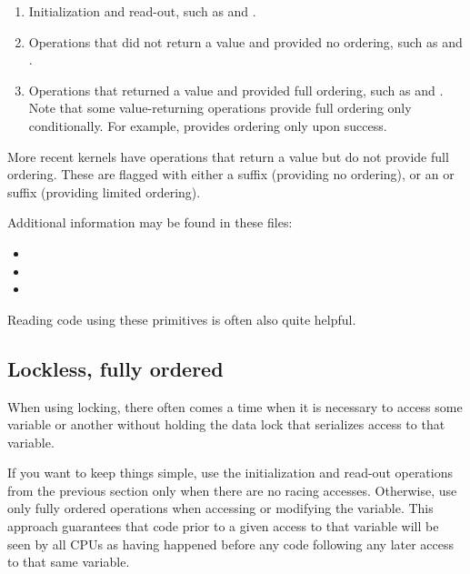 \begin{enumerate}
  \item Initialization and read-out, such as  and .

  \item Operations that did not return a value and provided no ordering,
	such as  and .

  \item Operations that returned a value and provided full ordering, such as
	 and .
	Note that some value-returning operations provide full ordering
	only conditionally.
	For example,  provides ordering only upon success.
\end{enumerate}

More recent kernels have operations that return a value but do not
provide full ordering.  These are flagged with either a 
suffix (providing no ordering), or an  or  suffix
(providing limited ordering).

Additional information may be found in these files:

\begin{itemize}
  \item {}
  \item {}
  \item {}
\end{itemize}

Reading code using these primitives is often also quite helpful.


\subsection{Lockless, fully ordered}

When using locking, there often comes a time when it is necessary
to access some variable or another without holding the data lock
that serializes access to that variable.

If you want to keep things simple, use the initialization and read-out
operations from the previous section only when there are no racing
accesses.
Otherwise, use only fully ordered operations when accessing or
modifying the variable.
This approach guarantees that code prior to a given access to that
variable will be seen by all CPUs as having happened before any code
following any later access to that same variable.

